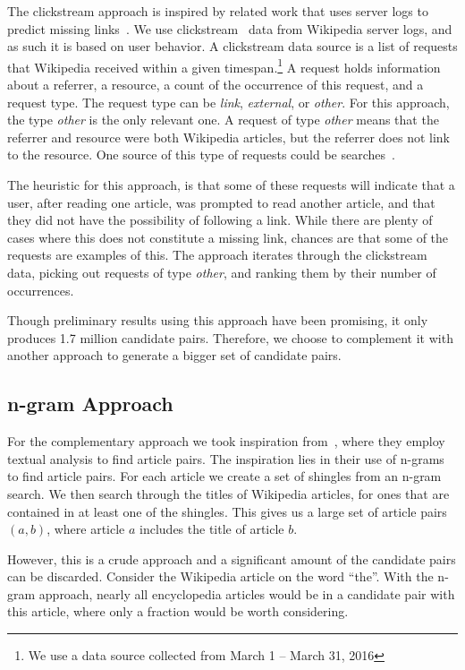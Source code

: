 The clickstream approach is inspired by related work that uses server logs to predict missing links~\cite{hyperlink-structure-using-logs}. We use clickstream~\cite{wiki-clickstream} data from Wikipedia server logs, and as such it is based on user behavior. A clickstream data source is a list of requests that Wikipedia received within a given timespan.\footnote{We use a data source collected from March 1 -- March 31, 2016} A request holds information about a referrer, a resource, a count of the occurrence of this request, and a request type. The request type can be \emph{link}, \emph{external}, or \emph{other}. For this approach, the type \emph{other} is the only relevant one. A request of type \emph{other} means that the referrer and resource were both Wikipedia articles, but the referrer does not link to the resource. One source of this type of requests could be searches~\cite{wiki-clickstream}.

The heuristic for this approach, is that some of these requests will indicate that a user, after reading one article, was prompted to read another article, and that they did not have the possibility of following a link. While there are plenty of cases where this does not constitute a missing link, chances are that some of the requests are examples of this. The approach iterates through the clickstream data, picking out requests of type \emph{other}, and ranking them by their number of occurrences.

Though preliminary results using this approach have been promising, it only produces 1.7 million candidate pairs.  Therefore, we choose to complement it with another approach to generate a bigger set of candidate pairs.

\subsection{n-gram Approach}

For the complementary approach we took inspiration from~\cite{milne2008learning}, where they employ textual analysis to find article pairs. The inspiration lies in their use of n-grams to find article pairs. For each article we create a set of shingles from an n-gram search. We then search through the titles of Wikipedia articles, for ones that are contained in at least one of the shingles. This gives us a large set of article pairs $(a,b)$, where article $a$ includes the title of article $b$.

However, this is a crude approach and a significant amount of the candidate pairs can be discarded. Consider the Wikipedia article on the word \enquote{the}. With the n-gram approach, nearly all encyclopedia articles would be in a candidate pair with this article, where only a fraction would be worth considering.

